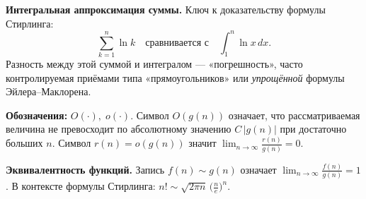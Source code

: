 
\textbf{Интегральная аппроксимация суммы.}
Ключ к доказательству формулы Стирлинга:
\[
\sum_{k=1}^{n}\ln k
\quad \text{сравнивается с} \quad
\int_{1}^{n}\ln x \,dx.
\]
Разность между этой суммой и интегралом — «погрешность», часто контролируемая приёмами типа «прямоугольников» или \emph{упрощённой} формулы Эйлера–Маклорена.

\medskip

\textbf{Обозначения: } $O(\cdot), \; o(\cdot).$
Символ $O(g(n))$ означает, что рассматриваемая величина не превосходит по абсолютному значению $C\,|g(n)|$ при достаточно больших $n$.  
Символ $r(n)=o(g(n))$ значит \(\lim_{n\to\infty}\frac{r(n)}{g(n)}=0\).

\medskip

\textbf{Эквивалентность функций.}
Запись $f(n)\sim g(n)$ означает \(\lim_{n\to\infty}\frac{f(n)}{g(n)}=1\). 
В контексте формулы Стирлинга: \(n!\sim \sqrt{2\pi n}\,\bigl(\tfrac{n}{e}\bigr)^n\). 
